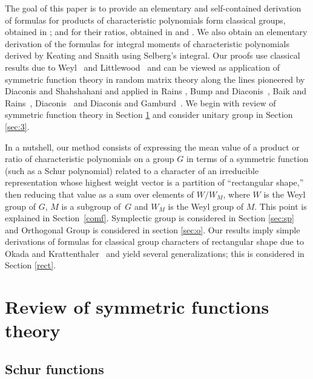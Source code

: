 \documentclass[11pt]{amsart}
\begin{document}
The goal of this paper is to provide an elementary and
self-contained derivation of formulas for products  of
characteristic polynomials form classical groups, obtained in
{\cite{CFKRS2}}; and for their ratios, obtained in {\cite{cfz}}
and {\cite{cfs}}.   We also obtain an elementary derivation of the
formulas for integral moments of characteristic polynomials
derived by Keating and Snaith {\cite{KS00,KS00a}} using Selberg's
integral. Our proofs use classical results due to Weyl~\cite{weyl}
and Littlewood~\cite{Li} and can be  viewed as application of
symmetric function theory in random matrix theory along the lines
pioneered by Diaconis and Shahshahani {\cite{DS94}} and applied in
Rains \cite{Ra98}, Bump and Diaconis~{\cite{BD02}}, Baik and
Rains~{\cite{BR02}}, Diaconis~{\cite{di03}} and Diaconis and
Gamburd~{\cite{DG04}}. We begin with review of symmetric function
theory in Section \ref{sec:2} and consider unitary group in
Section \ref{sec:3}.

In a nutshell, our method consists of expressing the mean value of
a product or ratio of characteristic polynomials on a group $G$ in
terms of a symmetric function (such as a Schur polynomial) related
to a character of an irreducible representation whose highest
weight vector is a partition of ``rectangular shape,'' then
reducing that value as a sum over elements of $W/W_M$, where $W$
is the Weyl group of $G$, $M$ is a subgroup of~$G$ and  $W_M$ is
the Weyl group of $M$. This point is explained in
Section~\ref{comf}. Symplectic group is considered in Section
\ref{sec:sp} and Orthogonal Group is considered in section
\ref{sec:o}. Our results imply  simple derivations of formulas for
classical group characters of rectangular shape due to Okada
\cite{ok} and Krattenthaler~\cite{krat} and yield several
generalizations; this is considered in Section \ref{rect}.





\section{Review of symmetric functions theory}\label{sec:2}

\subsection{Schur functions}
\end{document}
